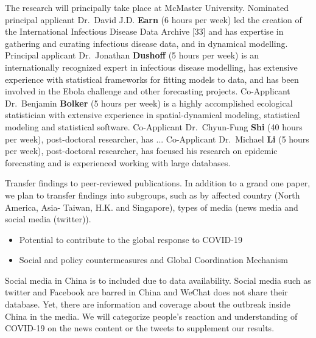 The research will principally take place at McMaster University. 
Nominated principal applicant Dr.\ David J.D. \textbf{Earn} (6 hours per week) led the creation of the International Infectious Disease Data Archive [33] and has expertise in gathering and curating infectious disease data, and in dynamical modelling.
Principal applicant Dr.\ Jonathan \textbf{Dushoff} (5 hours per week) is an internationally recognized expert in infectious disease modelling, has extensive experience with statistical frameworks for fitting models to data, and has been involved in the Ebola challenge and other forecasting projects. 
Co-Applicant Dr.\ Benjamin \textbf{Bolker} (5 hours per week) is a highly accomplished ecological statistician with extensive experience in spatial-dynamical modeling, statistical modeling and statistical software.
Co-Applicant Dr.\ Chyun-Fung \textbf{Shi} (40 hours per week), post-doctoral researcher, has ...
Co-Applicant Dr.\ Michael \textbf{Li} (5 hours per week), post-doctoral researcher, has focused his research on epidemic forecasting and is experienced working with large databases. 







Transfer findings to peer-reviewed publications.  
In addition to a grand one paper, we plan to transfer findings into subgroups, such as by affected country (North America, Asia- Taiwan, H.K. and Singapore), types of media (news media and social media (twitter)).

\begin{itemize}
\item{Potential to contribute to the global response to COVID-19}
\item{Social and policy countermeasures and Global Coordination Mechanism}
\end{itemize}


Social media in China is to included due to data availability.   Social media such as twitter and Facebook are barred in China and WeChat does not share their database. Yet, there are information and coverage about the outbreak inside China in the media.  We will categorize people’s reaction and understanding of COVID-19  on the news content or the tweets to supplement our results.


